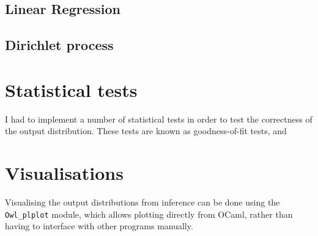 \subsection{Linear Regression}

\subsection{Dirichlet process}


\section{Statistical tests}
I had to implement a number of statistical tests in order to test the correctness of the output distribution. These tests are known as goodness-of-fit tests, and 

\section{Visualisations}
Visualising the output distributions from inference can be done using the \texttt{Owl\_plplot} module, which allows plotting directly from OCaml, rather than having to interface with other programs manually.